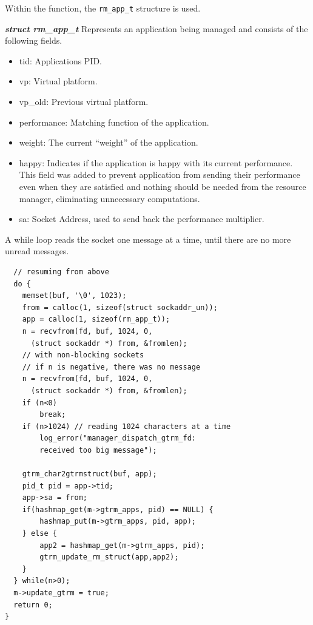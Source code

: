 \documentclass[nobiblatex]{LTHthesis}
\begin{document}
Within the function, the \texttt{rm\_app\_t} structure is used.
\begin{framed}
	\begin{flushleft}
		\textbf{\emph{struct rm\_app\_t}}
		Represents an application being managed and consists of the 
	following fields.
		\begin{itemize}
		\item tid: Applications PID.
		\item vp: Virtual platform.
		\item vp\_old: Previous virtual platform.
		\item performance: Matching function of the application.
		\item weight: The current ``weight'' of the application.
		\item happy: Indicates if the application is happy with its 
	  current performance. This field was added to prevent application from
	  sending their performance even when they are satisfied and nothing 
	  should be needed from the resource manager, eliminating unnecessary 
	  computations.
		\item sa: Socket Address, used to send back the performance 
	  multiplier.
		\end{itemize}
	\end{flushleft}	
\end{framed}

A while loop reads the socket one message at a time, until there are no 
more unread messages. 

\begin{lstlisting}
  // resuming from above
  do {		
  	memset(buf, '\0', 1023);
  	from = calloc(1, sizeof(struct sockaddr_un));
  	app = calloc(1, sizeof(rm_app_t));	
  	n = recvfrom(fd, buf, 1024, 0, 
	  (struct sockaddr *) from, &fromlen);
	// with non-blocking sockets
  	// if n is negative, there was no message
  	n = recvfrom(fd, buf, 1024, 0, 
	  (struct sockaddr *) from, &fromlen);
  	if (n<0)
  		break;
  	if (n>1024) // reading 1024 characters at a time
  		log_error("manager_dispatch_gtrm_fd:
		received too big message");

  	gtrm_char2gtrmstruct(buf, app);
  	pid_t pid = app->tid;
  	app->sa = from;
  	if(hashmap_get(m->gtrm_apps, pid) == NULL) {
  		hashmap_put(m->gtrm_apps, pid, app);
  	} else {
  		app2 = hashmap_get(m->gtrm_apps, pid);
  		gtrm_update_rm_struct(app,app2);
  	}															
  } while(n>0);
  m->update_gtrm = true;
  return 0;
}
\end{lstlisting}
\end{document}
